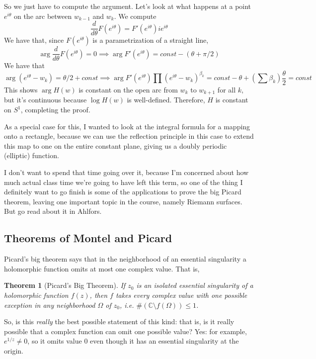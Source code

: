 \documentclass{article}
\newtheorem{theorem}{Theorem}
\newcommand{\mbb}[1]{\mathbb{#1}}
\begin{document}
So we just have to compute the argument. Let's look at what happens at a point \(e^{i\theta}\) on the arc between \(w_{k - 1}\) and \(w_k\). We compute
\begin{equation}\frac{d}{d\theta}F(e^{i\theta}) = F'(e^{i\theta})ie^{i\theta}\end{equation}
We have that, since \(F(e^{i\theta})\) is a parametrization of a straight line,
\begin{equation}\arg\frac{d}{d\theta}F(e^{i\theta}) = 0 \implies \arg F'(e^{i\theta}) = const - (\theta + \pi/2)\end{equation}
We have that
\begin{equation}\arg(e^{i\theta} - w_k) = \theta/2 + const \implies \arg F'(e^{i\theta})\prod(e^{i\theta} - w_k)^{\beta_k} = const - \theta + (\sum\beta_k)\frac{\theta}{2} = const\end{equation}
This shows \(\arg H(w)\) is constant on the open arc from \(w_k\) to \(w_{k + 1}\) for all \(k\), but it's continuous because \(\log H(w)\) is well-defined. Therefore, \(H\) is constant on \(S^1\), completing the proof.

As a special case for this, I wanted to look at the integral formula for a mapping onto a rectangle, because we can use the reflection principle in this case to extend this map to one on the entire constant plane, giving us a doubly periodic (elliptic) function.

I don't want to spend that time going over it, because I'm concerned about how much actual class time we're going to have left this term, so one of the thing I definitely want to go finish is some of the applications to prove the big Picard theorem, leaving one important topic in the course, namely Riemann surfaces. But go read about it in Ahlfors.


\subsection{Theorems of Montel and Picard}

Picard's big theorem says that in the neighborhood of an essential singularity a holomorphic function omits at most one complex value. That is,
\begin{theorem}[Picard's Big Theorem]
If \(z_0\) is an isolated essential singularity of a holomorphic function \(f(z)\), then \(f\) takes every complex value with one possible exception in any neighborhood \(\Omega\) of \(z_0\), i.e. \(\#(\mbb{C}\setminus f(\Omega)) \leq 1\).
\end{theorem}
So, is this \textit{really} the best possible statement of this kind: that is, is it really possible that a complex function can omit one possible value? Yes: for example, \(e^{1/z} \neq 0\), so it omits value \(0\) even though it has an essential singularity at the origin.
\end{document}
